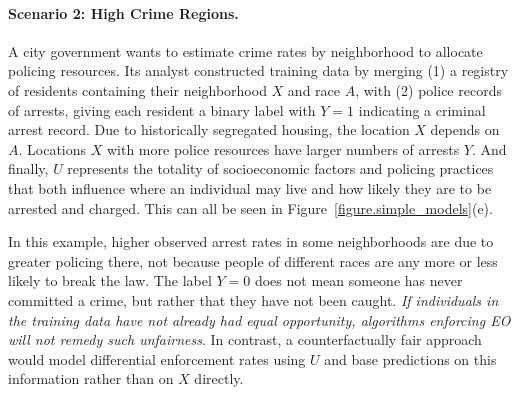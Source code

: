 \paragraph{Scenario 2: High Crime Regions.}
A city government wants to estimate crime rates by neighborhood to
allocate policing resources. Its analyst constructed training data
by merging (1) a registry of residents containing their neighborhood $X$
and race $A$, with (2) police records of arrests, giving each resident a
binary label with $Y = 1$ indicating a criminal arrest record.
Due to historically segregated housing, the location $X$ 
depends on $A$.
Locations $X$ with more police resources have larger numbers of
arrests $Y$.
And finally, $U$ represents the totality of socioeconomic factors
and policing practices that both influence where an individual may
live and how likely they are to be arrested and charged.
This can all be seen in Figure~\ref{figure.simple_models}(e).

In this example,
higher observed arrest rates in some neighborhoods
are due to greater policing there, not because people of different races
are any more or less likely to break the law.
The label $Y = 0$ does not
mean someone has never committed a crime, but rather that they have not
been caught.
{\em If individuals in the training data have not already had equal
  opportunity, algorithms enforcing EO will not remedy such unfairness}.
In contrast, a counterfactually fair approach would model
differential enforcement rates using $U$ and base predictions
on this information rather than on $X$ directly.

